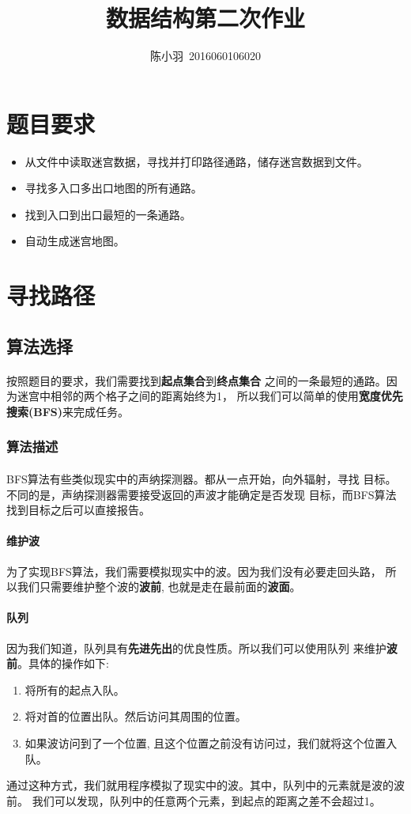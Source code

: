 \documentclass{article}
\title{数据结构第二次作业}
\author{陈小羽\ 2016060106020}
\date{}
\begin{document}
\maketitle
\tableofcontents
\section{题目要求}
	\begin{itemize}
		\item 从文件中读取迷宫数据，寻找并打印路径通路，储存迷宫数据到文件。
		\item 寻找多入口多出口地图的所有通路。
		\item 找到入口到出口最短的一条通路。
		\item 自动生成迷宫地图。
	\end{itemize}
\section{寻找路径}
	\subsection{算法选择}
		\paragraph{}
			按照题目的要求，我们需要找到\textbf{起点集合}到\textbf{终点集合}
			之间的一条最短的通路。因为迷宫中相邻的两个格子之间的距离始终为1，
			所以我们可以简单的使用\textbf{宽度优先搜索(BFS)}来完成任务。
		\subsubsection{算法描述}
			\paragraph{}
				BFS算法有些类似现实中的声纳探测器。都从一点开始，向外辐射，寻找
				目标。不同的是，声纳探测器需要接受返回的声波才能确定是否发现
				目标，而BFS算法找到目标之后可以直接报告。
			\paragraph{维护波}
				为了实现BFS算法，我们需要模拟现实中的波。因为我们没有必要走回头路，
				所以我们只需要维护整个波的\textbf{波前}, 也就是走在最前面的\textbf{波面}。
			\paragraph{队列}
				因为我们知道，队列具有\textbf{先进先出}的优良性质。所以我们可以使用队列
				来维护\textbf{波前}。具体的操作如下:
				\begin{enumerate}[1]
					\item 将所有的起点入队。
					\item 将对首的位置出队。然后访问其周围的位置。
					\item 如果波访问到了一个位置, 且这个位置之前没有访问过，我们就将这个位置入队。
				\end{enumerate}
				通过这种方式，我们就用程序模拟了现实中的波。其中，队列中的元素就是波的波前。
				我们可以发现，队列中的任意两个元素，到起点的距离之差不会超过1。
\end{document}
